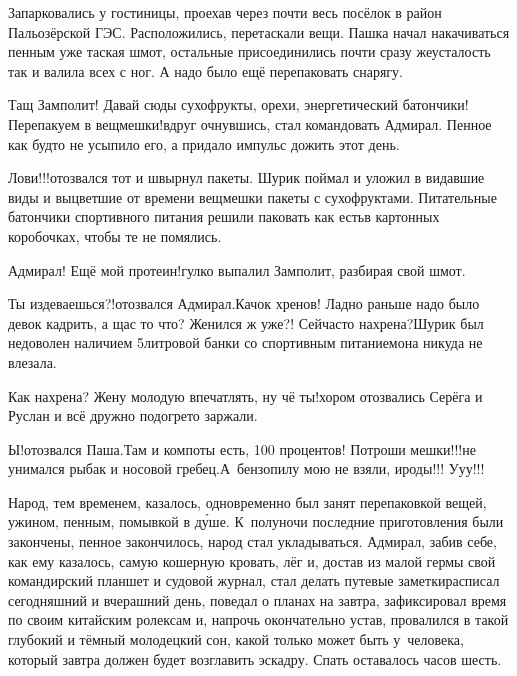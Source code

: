 Запарковались у гостиницы, проехав через почти весь посёлок в район Пальозёрской ГЭС. Расположились, перетаскали вещи. Пашка начал накачиваться пенным уже таская шмот, остальные присоединились почти сразу же\mdash усталость так и валила всех с ног. А надо было ещё перепаковать снарягу.

\diagdash Тащ Замполит! Давай сюды сухофрукты, орехи, энергетический батончики! Перепакуем в вещмешки!\mdash вдруг очнувшись, стал командовать Адмирал. Пенное как будто не усыпило его, а придало импульс дожить этот день. 

\diagdash Лови!!!\mdash отозвался тот и швырнул пакеты. Шурик поймал и уложил в видавшие виды и выцветшие от времени вещмешки пакеты с сухофруктами. Питательные батончики спортивного питания решили паковать как есть\mdash в картонных коробочках, чтобы те не помялись.

\diagdash Адмирал! Ещё мой протеин!\mdash гулко выпалил Замполит, разбирая свой шмот.

\diagdash Ты издеваешься?!\mdash отозвался Адмирал.\mdash Качок хренов! Ладно раньше надо было девок кадрить, а щас то что? Женился ж уже?! Сейчас\sdash то нахрена?\mdash Шурик был недоволен наличием 5\sdash литровой банки со спортивным питанием\mdash она никуда не влезала.

\diagdash Как нахрена? Жену молодую впечатлять, ну чё ты!\mdash хором отозвались Серёга и Руслан и всё дружно подогрето заржали.

\diagdash Ы!\mdash отозвался Паша.\mdash Там и компоты есть, 100 процентов! Потроши мешки!!!\mdash не унимался рыбак и носовой гребец.\mdash А~бензопилу мою не взяли, ироды!!! У\sdash у\sdash у!!!

Народ, тем временем, казалось, одновременно был занят перепаковкой вещей, ужином, пенным, помывкой в д\'{у}ше. К~полуночи последние приготовления были закончены, пенное закончилось, народ стал укладываться. Адмирал, забив себе, как ему казалось, самую кошерную кровать, лёг и, достав из малой гермы свой командирский планшет и судовой журнал, стал делать путевые заметки\mdash расписал сегодняшний и вчерашний день, поведал о планах на завтра, зафиксировал время по своим китайским ролексам и, напрочь окончательно устав, провалился в такой глубокий и тёмный молодецкий сон, какой только может быть у~человека, который завтра должен будет возглавить эскадру. Спать оставалось часов шесть.

\begin{center}
\end{center}

 






